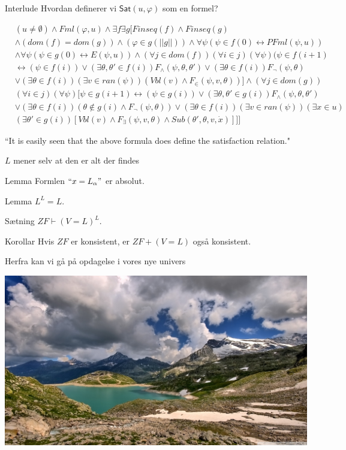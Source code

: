 \documentclass{beamer}
\DeclareMathOperator{\proves}{\vdash}
\begin{document}
\begin{frame}{Interlude}
Hvordan definerer vi $\mathsf{Sat}(u,\varphi)$ som en formel?

\pause\begin{align*}
&(u\neq\emptyset)\land Fml(\varphi,u)\land\exists f\exists g[Finseq(f)\land Finseq (g)\\
&\land (dom(f)=dom(g))\land(\varphi\in g(||g||))\land\forall\psi(\psi\in f(0)\leftrightarrow PFml(\psi,u))\\
&\land\forall\psi(\psi\in g(0)\leftrightarrow E(\psi,u))\land(\forall j\in dom(f))(\forall i\in j)(\forall\psi)(\psi\in f(i+1)\\
&\leftrightarrow (\psi\in f(i))\lor(\exists\theta,\theta'\in f(i))F_\land(\psi,\theta,\theta')\lor(\exists\theta\in f(i))F_\lnot(\psi,\theta)\\
&\lor(\exists\theta\in f(i))(\exists v\in ran(\psi))(Vbl(v)\land F_\in(\psi,v,\theta))]\land(\forall j\in dom(g))\\
&(\forall i\in j)(\forall\psi)[\psi\in g(i+1)\leftrightarrow(\psi\in g(i))\lor(\exists\theta,\theta'\in g(i))F_\land(\psi,\theta,\theta')\\
&\lor(\exists\theta\in f(i))(\theta\notin g(i)\land F_\lnot(\psi,\theta))\lor(\exists\theta\in f(i))(\exists v\in ran(\psi))(\exists x\in u)\\
&(\exists\theta'\in g(i))[Vbl(v)\land F_\exists(\psi,v,\theta)\land Sub(\theta',\theta,v,\dot{x})]]]
\end{align*}

\pause ``It is easily seen that the above formula does define the satisfaction relation."
\end{frame}

\begin{frame}{$L$ mener selv at den er alt der findes}
\pause\begin{block}{Lemma}
Formlen $``x=L_\alpha"$ er absolut.
\end{block}

\pause\begin{block}{Lemma}
$L^L=L$.
\end{block}

\pause\begin{block}{Sætning}
$ZF\proves (V=L)^L$.
\end{block}

\pause\begin{block}{Korollar}
Hvis $ZF$ er konsistent, er $ZF+(V=L)$ også konsistent.
\end{block}
\end{frame}

\begin{frame}{Herfra kan vi gå på opdagelse i vores nye univers}
\begin{center}
\includegraphics[scale=0.13]{Explore.jpg}
\end{center}
\end{frame}
\end{document}
